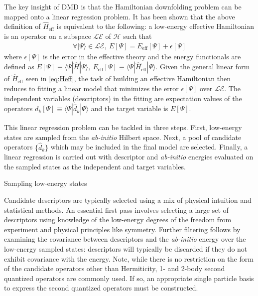 \documentclass[12pt]{article}
\begin{document}
The key insight of DMD is that the Hamiltonian downfolding problem can be mapped onto a linear regression problem.
It has been shown \cite{Zheng2017} that the above definition of $\hat{H}_\text{eff}$ is equivalent to the following: a low-energy effective Hamiltonian is an operator on a subspace $\mathcal{LE}$ of $\mathcal{H}$ such that 
\begin{equation}
\begin{split}
\forall |\Psi\rangle \in \mathcal{LE},\ E[\Psi] = E_\text{eff}[\Psi]  + \epsilon[\Psi]
\end{split}
\label{eq:DMD}
\end{equation}
where $\epsilon[\Psi]$ is the error in the effective theory and the energy functionals are defined as $E[\Psi] \equiv \langle \Psi | \hat{H} |\Psi \rangle,\  E_\text{eff}[\Psi] \equiv \langle \Psi | \hat{H}_\text{eff} |\Psi \rangle$.
Given the general linear form of $\hat{H}_\text{eff}$ seen in \eqref{eq:Heff}, 
the task of building an effective Hamiltonian then reduces to fitting a linear model that minimizes the error $\epsilon[\Psi]$ over $\mathcal{LE}$.
The independent variables (descriptors) in the fitting are expectation values of the operators $d_k[\Psi] \equiv \langle \Psi |\hat{d}_k|\Psi \rangle$ and the target variable is $E[\Psi]$.

This linear regression problem can be tackled in three steps.
First, low-energy states are sampled from the \textit{ab-initio} Hilbert space.
Next, a pool of candidate operators $\{\hat{d}_k\}$ which may be included in the final model are selected.
Finally, a linear regression is carried out with descriptor and \textit{ab-initio} energies evaluated on the sampled states as the independent and target variables.

Sampling low-energy states  %

Candidate descriptors are typically selected using a mix of physical intuition and statistical methods.
An essential first pass involves selecting a large set of descriptors using knowledge of the low-energy degrees of the freedom from experiment and physical principles like symmetry.
Further filtering follows by examining the covariance between descriptors and the \textit{ab-initio} energy over the low-energy sampled states: descriptors will typically be discarded if they do not exhibit covariance with the energy.
Note, while there is no restriction on the form of the candidate operators other than Hermiticity, 1- and 2-body second quantized operators are commonly used.
If so, an appropriate single particle basis to express the second quantized operators must be constructed.
\end{document}

